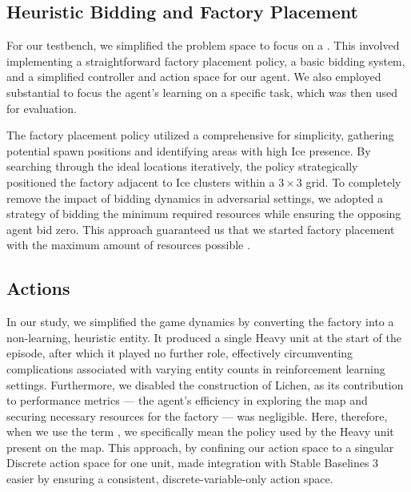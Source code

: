 \subsection{Heuristic Bidding and Factory Placement}
\label{subsec:single-bidding-factory}

\noindent For our testbench, we simplified the problem space to focus on a . This involved implementing a straightforward factory placement policy, a basic bidding system, and a simplified controller and action space for our agent. We also employed substantial  to focus the agent's learning on a specific task, which was then used for evaluation.

\bigskip 

\noindent The factory placement policy utilized a comprehensive  for simplicity, gathering potential spawn positions and identifying areas with high Ice presence. By searching through the ideal locations iteratively, the policy strategically positioned the factory adjacent to Ice clusters within a $3 \times 3$ grid. To completely remove the impact of bidding dynamics in adversarial settings, we adopted a strategy of bidding the minimum required resources while ensuring the opposing agent bid zero. This approach guaranteed us that we started factory placement with the maximum amount of resources possible \protect\footnotemark.


\subsection{Actions}
\label{subsec:single-environment}

\noindent In our study, we simplified the game dynamics by converting the factory into a non-learning, heuristic entity. It produced a single Heavy unit at the start of the episode, after which it played no further role, effectively circumventing complications associated with varying entity counts in reinforcement learning settings. Furthermore, we disabled the construction of Lichen, as its contribution to performance metrics — the agent's efficiency in exploring the map and securing necessary resources for the factory — was negligible. Here, therefore, when we use the term , we specifically mean the policy used by the Heavy unit present on the map. This approach, by confining our action space to a singular Discrete action space for one unit, made integration with Stable Baselines 3 easier by ensuring a consistent, discrete-variable-only action space.

